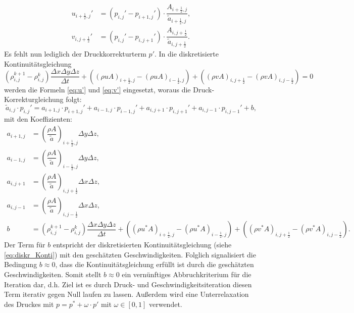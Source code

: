 \begin{align}
u_{i+\frac{1}{2},j}'&= \left(p_{i,j}'-p_{i+1,j}'\right)\cdot \dfrac{A_{i+\frac{1}{2},j}}{\tilde{a}_{i+\frac{1}{2},j}}, \label{eq:u'}\\
v_{i,j+\frac{1}{2}}'&= \left(p_{i,j}'-p_{i,j+1}'\right)\cdot \dfrac{A_{i,j+\frac{1}{2}}}{\tilde{a}_{i,j+\frac{1}{2}}}.\label{eq:v'}
\end{align}
Es fehlt nun lediglich der Druckkorrekturterm $p'$. In die diskretisierte Kontinuit\"atsgleichung 
\begin{equation} \label{eq:diskr_Konti}
\left(\rho_{i,j}^{k+1}-\rho_{i,j}^{k}\right)\dfrac{\Delta x\Delta y\Delta z}{\Delta t} + \left(\left(\rho u A\right)_{i+\frac{1}{2},j}-\left(\rho u A\right)_{i-\frac{1}{2},j}\right) + \left(\left(\rho v A\right)_{i,j+\frac{1}{2}}-\left(\rho v A\right)_{i,j-\frac{1}{2}}\right)=0
\end{equation}
werden die Formeln \eqref{eq:u'} und \eqref{eq:v'} eingesetzt, woraus die Druck-Korrekturgleichung folgt:
\begin{equation} \label{eq:druckkorrekturglg}
\tilde{a}_{i,j}\cdot p_{i,j}' = a_{i+1,j}\cdot p_{i+1,j}'+a_{i-1,j}\cdot p_{i-1,j}'+a_{i,j+1}\cdot p_{i,j+1}'+a_{i,j-1}\cdot p_{i,j-1}'+b,
\end{equation}
mit den Koeffizienten:
\begin{align}
a_{i+1,j}&=\left(\dfrac{\rho A}{\tilde{a}}\right)_{i+\frac{1}{2},j}\Delta y\Delta z, \\
a_{i-1,j}&=\left(\dfrac{\rho A}{\tilde{a}}\right)_{i-\frac{1}{2},j}\Delta y\Delta z, \\
a_{i,j+1}&=\left(\dfrac{\rho A}{\tilde{a}}\right)_{i,j+\frac{1}{2}}\Delta x\Delta z, \\
a_{i,j-1}&=\left(\dfrac{\rho A}{\tilde{a}}\right)_{i,j-\frac{1}{2}}\Delta x\Delta z, \\
b &= \left(\rho_{i,j}^{k+1}-\rho_{i,j}^{k}\right)\dfrac{\Delta x\Delta y\Delta z}{\Delta t} + \left(\left(\rho u^{*} A\right)_{i+\frac{1}{2},j}-\left(\rho u^{*} A\right)_{i-\frac{1}{2},j}\right) + \left(\left(\rho v^{*} A\right)_{i,j+\frac{1}{2}}-\left(\rho v^{*} A\right)_{i,j-\frac{1}{2}}\right). \label{eq:b}
\end{align}
Der Term f\"ur $b$ entspricht der diskretisierten Kontinuit\"atsgleichung (siehe \eqref{eq:diskr_Konti}) mit den gesch\"atzten Geschwindigkeiten. Folglich signalisiert die Bedingung $b\approx0$, dass die Kontinuit\"atsgleichung erf\"ullt ist durch die gesch\"atzten Geschwindigkeiten. Somit stellt $b\approx0$ ein vern\"unftiges Abbruchkriterium f\"ur die Iteration dar, d.h. Ziel ist es durch Druck- und Geschwindigkeitsiteration diesen Term iterativ gegen Null laufen zu lassen. Au\ss{}erdem wird eine Unterrelaxation des Druckes mit $p=p^{*}+\omega\cdot p'$ mit $\omega\in[0,1]$ verwendet. \\
